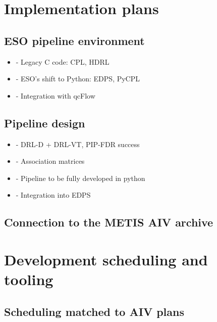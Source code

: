 \documentclass[a4paper]{spie}  %
\begin{document}
\section{Implementation plans}
\label{sec:implementation}

\subsection{ESO pipeline environment}
\label{ssec:imp_eso}

 \begin{itemize}
     \item - Legacy C code: CPL, HDRL
     \item - ESO's shift to Python: EDPS, PyCPL
     \item - Integration with qcFlow
 \end{itemize}

\subsection{Pipeline design}
\label{ssec:imp_pip}

 \begin{itemize}
     \item - DRL-D + DRL-VT, PIP-FDR success
     \item - Association matrices
     \item - Pipeline to be fully developed in python
     \item - Integration into EDPS
 \end{itemize}
 
\subsection{Connection to the METIS AIV archive}
\label{ssec:imp_archive}



\section{Development scheduling and tooling}
\label{sec:development}

\subsection{Scheduling matched to AIV plans}
\label{ssec:dev_aiv}
\end{document}
